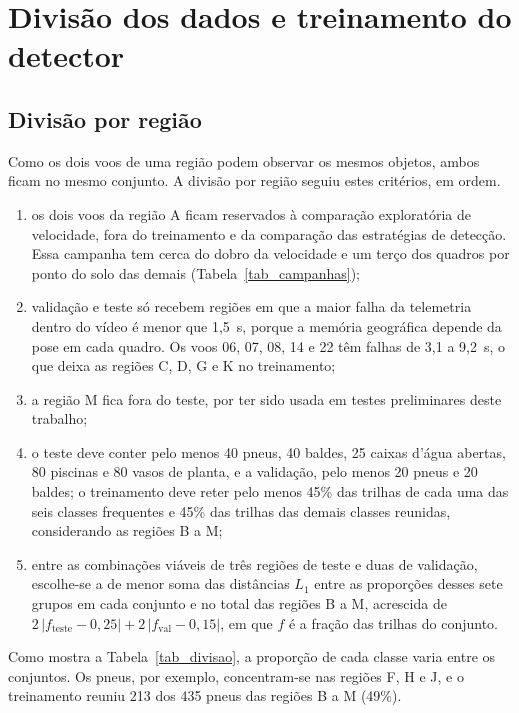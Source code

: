 \section{Divisão dos dados e treinamento do detector}
\label{sec_detector}

\subsection{Divisão por região}

Como os dois voos de uma região podem observar os mesmos objetos, ambos ficam no mesmo conjunto. A divisão por região seguiu estes critérios, em ordem.
\begin{enumerate}
  \item os dois voos da região A ficam reservados à comparação exploratória de velocidade, fora do treinamento e da comparação das estratégias de detecção. Essa campanha tem cerca do dobro da velocidade e um terço dos quadros por ponto do solo das demais (Tabela~\ref{tab_campanhas});
  \item validação e teste só recebem regiões em que a maior falha da telemetria dentro do vídeo é menor que 1,5~s, porque a memória geográfica depende da pose em cada quadro. Os voos 06, 07, 08, 14 e 22 têm falhas de 3,1 a 9,2~s, o que deixa as regiões C, D, G e K no treinamento;
  \item a região M fica fora do teste, por ter sido usada em testes preliminares deste trabalho;
  \item o teste deve conter pelo menos 40 pneus, 40 baldes, 25 caixas d'água abertas, 80 piscinas e 80 vasos de planta, e a validação, pelo menos 20 pneus e 20 baldes; o treinamento deve reter pelo menos 45\% das trilhas de cada uma das seis classes frequentes e 45\% das trilhas das demais classes reunidas, considerando as regiões B a M;
  \item entre as combinações viáveis de três regiões de teste e duas de validação, escolhe-se a de menor soma das distâncias $L_1$ entre as proporções desses sete grupos em cada conjunto e no total das regiões B a M, acrescida de $2\,|f_{\mathrm{teste}}-0{,}25| + 2\,|f_{\mathrm{val}}-0{,}15|$, em que $f$ é a fração das trilhas do conjunto.
\end{enumerate}
Como mostra a Tabela~\ref{tab_divisao}, a proporção de cada classe varia entre os conjuntos. Os pneus, por exemplo, concentram-se nas regiões F, H e J, e o treinamento reuniu 213 dos 435 pneus das regiões B a M (49\%).

